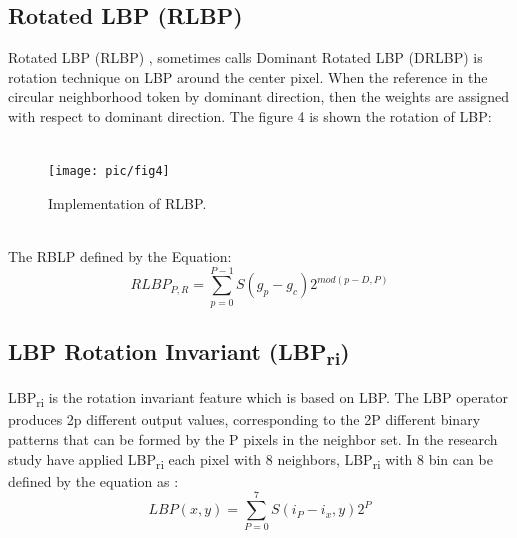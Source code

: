 \documentclass[review]{elsarticle}
\begin{document}
\subsection{Rotated LBP (RLBP)}
Rotated LBP (RLBP) \cite{Mehta2013}, sometimes calls Dominant Rotated LBP (DRLBP) \cite{Mehta2016} is rotation technique on LBP around the center pixel. When the reference in the circular neighborhood token by dominant direction, then the weights are assigned with respect to dominant direction. The figure 4 is shown the rotation of LBP: \\ \\  
\begin{figure}[h!]
	\centering
	\texttt{[image: pic/fig4]}
	\caption{Implementation of RLBP.}
	\label{fig:fig4}
\end{figure} \\
The RBLP defined by the Equation:\\
\begin{equation}
RLBP_{P,R} = \sum_{p=0}^{P-1} S(g_p - g_c)2^{mod(p-D,P)}
\end{equation}
\subsection{LBP Rotation Invariant (LBP\textsubscript{ri})} 
LBP\textsubscript{ri} is the rotation invariant feature which is based on LBP. The LBP operator produces 2p different output values, corresponding to the 2P different binary patterns that can be formed by the P pixels in the neighbor set. In the research study have applied LBP\textsubscript{ri} each pixel with 8 neighbors, LBP\textsubscript{ri} with 8 bin can be defined by the equation as :  
\begin{equation}
LBP(x,y) = \sum_{P=0}^{7} S(i_P - i_x,y)2^P
\end{equation}
\end{document}
